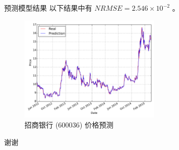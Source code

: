 \documentclass{beamer}
\begin{document}
\begin{frame}{预测模型}{结果}
以下结果中有 $NRMSE=2.546\times 10^{-2}$ 。

\begin{figure}
  \includegraphics[width=0.6\textwidth]{plots/price_forecast_regression_line.pdf}
  \caption{招商银行 (600036) 价格预测}
\end{figure}
\end{frame}

\begin{frame}
\begin{center}
  \Huge 谢谢
\end{center}
\end{frame}
\end{document}
